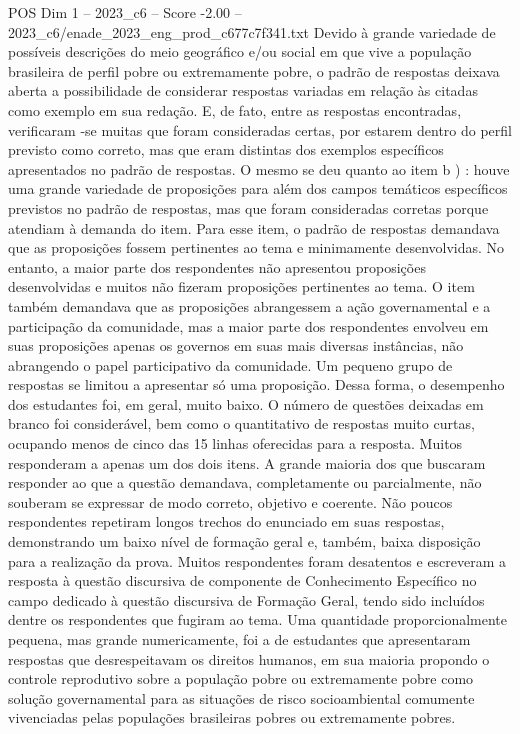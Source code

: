 \begin{textsample}{POS Dim 1 – 2023\_c6 – Score -2.00 – 2023\_c6/enade\_2023\_eng\_prod\_c677c7f341.txt}
Devido à grande variedade de possíveis descrições do meio geográfico e/ou social em que vive a população brasileira de perfil pobre ou extremamente pobre, o padrão de respostas deixava aberta a possibilidade de considerar respostas variadas em relação às citadas como exemplo em sua redação.
E, de fato, entre as respostas encontradas, verificaram -se muitas que foram consideradas certas, por estarem dentro do perfil previsto como correto, mas que eram distintas dos exemplos específicos apresentados no padrão de respostas.
O mesmo se deu quanto ao item b ) : houve uma grande variedade de proposições para além dos campos temáticos específicos previstos no padrão de respostas, mas que foram consideradas corretas porque atendiam à demanda do item.
Para esse item, o padrão de respostas demandava que as proposições fossem pertinentes ao tema e minimamente desenvolvidas.
No entanto, a maior parte dos respondentes não apresentou proposições desenvolvidas e muitos não fizeram proposições pertinentes ao tema.
O item também demandava que as proposições abrangessem a ação governamental e a participação da comunidade, mas a maior parte dos respondentes envolveu em suas proposições apenas os governos em suas mais diversas instâncias, não abrangendo o papel participativo da comunidade.
Um pequeno grupo de respostas se limitou a apresentar só uma proposição.
Dessa forma, o desempenho dos estudantes foi, em geral, muito baixo.
O número de questões deixadas em branco foi considerável, bem como o quantitativo de respostas muito curtas, ocupando menos de cinco das 15 linhas oferecidas para a resposta.
Muitos responderam a apenas um dos dois itens.
A grande maioria dos que buscaram responder ao que a questão demandava, completamente ou parcialmente, não souberam se expressar de modo correto, objetivo e coerente.
Não poucos respondentes repetiram longos trechos do enunciado em suas respostas, demonstrando um baixo nível de formação geral e, também, baixa disposição para a realização da prova.
Muitos respondentes foram desatentos e escreveram a resposta à questão discursiva de componente de Conhecimento Específico no campo dedicado à questão discursiva de Formação Geral, tendo sido incluídos dentre os respondentes que fugiram ao tema.
Uma quantidade proporcionalmente pequena, mas grande numericamente, foi a de estudantes que apresentaram respostas que desrespeitavam os direitos humanos, em sua maioria propondo o controle reprodutivo sobre a população pobre ou extremamente pobre como solução governamental para as situações de risco socioambiental comumente vivenciadas pelas populações brasileiras pobres ou extremamente pobres.

\end{textsample}
